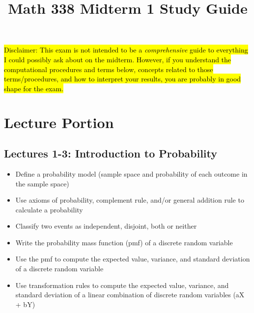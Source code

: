\documentclass[11pt]{article} %
\title{Math 338 Midterm 1 Study Guide}
\date{}
\begin{document}
\maketitle

\hl{Disclaimer: This exam is not intended to be a \emph{comprehensive} guide to everything I could possibly ask about on the midterm. However, if you understand the computational procedures and terms below, concepts related to those terms/procedures, and how to interpret your results, you are probably in good shape for the exam.}

\section{Lecture Portion}

\subsection{Lectures 1-3: Introduction to Probability}

\begin{itemize}
\item Define a probability model (sample space and probability of each outcome in the sample space)
\item Use axioms of probability, complement rule, and/or general addition rule to calculate a probability
\item Classify two events as independent, disjoint, both or neither
\item Write the probability mass function (pmf) of a discrete random variable
\item Use the pmf to compute the expected value, variance, and standard deviation of a discrete random variable
\item Use transformation rules to compute the expected value, variance, and standard deviation of a linear combination of discrete random variables (aX + bY)
\end{itemize}
\end{document}

